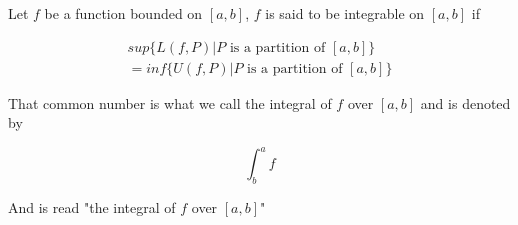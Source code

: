 \documentclass{report}
\begin{document}
    \begin{defBox}
        Let $f$ be a function bounded on $[a,b]$, $f$ is said to be integrable on $[a,b]$ if


        \begin{align*}
            sup\{L(f,P) | P \text{ is a partition of } [a,b]\}\\
            = inf\{U(f,P) | P \text{ is a partition of } [a,b]\}
        \end{align*}

        That common number is what we call the integral of $f$ over $[a,b]$ and is denoted by

        $$\int_{b}^{a}f$$

        And is read "the integral of $f$ over $[a,b]$"
    \end{defBox}

\end{document}
